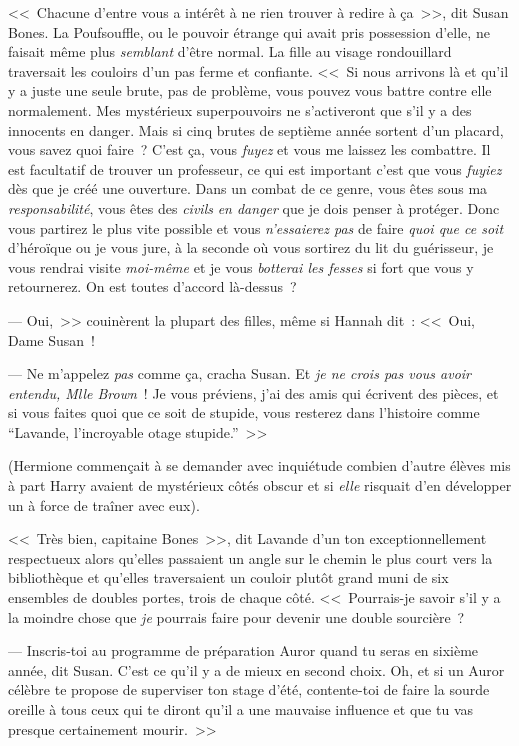 <<~Chacune d'entre vous a intérêt à ne rien trouver à redire à ça~>>, dit Susan Bones. La Poufsouffle, ou le pouvoir étrange qui avait pris possession d'elle, ne faisait même plus \emph{semblant} d'être normal. La fille au visage rondouillard traversait les couloirs d'un pas ferme et confiante. <<~Si nous arrivons là et qu'il y a juste une seule brute, pas de problème, vous pouvez vous battre contre elle normalement. Mes mystérieux superpouvoirs ne s'activeront que s'il y a des innocents en danger. Mais si cinq brutes de septième année sortent d'un placard, vous savez quoi faire~? C'est ça, vous \emph{fuyez} et vous me laissez les combattre. Il est facultatif de trouver un professeur, ce qui est important c'est que vous \emph{fuyiez} dès que je créé une ouverture. Dans un combat de ce genre, vous êtes sous ma \emph{responsabilité}, vous êtes des \emph{civils} \emph{en danger} que je dois penser à protéger. Donc vous partirez le plus vite possible et vous \emph{n'essaierez pas} de faire \emph{quoi que ce soit} d'héroïque ou je vous jure, à la seconde où vous sortirez du lit du guérisseur, je vous rendrai visite \emph{moi-même} et je vous \emph{botterai les fesses} si fort que vous y retournerez. On est toutes d'accord là-dessus~?

--- Oui,~>> couinèrent la plupart des filles, même si Hannah dit~: <<~Oui, Dame Susan~!

--- Ne m'appelez \emph{pas} comme ça, cracha Susan. Et \emph{je ne crois pas vous avoir entendu, Mlle Brown}~! Je vous préviens, j'ai des amis qui écrivent des pièces, et si vous faites quoi que ce soit de stupide, vous resterez dans l'histoire comme “Lavande, l'incroyable otage stupide.”~>>

(Hermione commençait à se demander avec inquiétude combien d'autre élèves mis à part Harry avaient de mystérieux côtés obscur et si \emph{elle} risquait d'en développer un à force de traîner avec eux).

<<~Très bien, capitaine Bones~>>, dit Lavande d'un ton exceptionnellement respectueux alors qu'elles passaient un angle sur le chemin le plus court vers la bibliothèque et qu'elles traversaient un couloir plutôt grand muni de six ensembles de doubles portes, trois de chaque côté. <<~Pourrais-je savoir s'il y a la moindre chose que \emph{je} pourrais faire pour devenir une double sourcière~?

--- Inscris-toi au programme de préparation Auror quand tu seras en sixième année, dit Susan. C'est ce qu'il y a de mieux en second choix. Oh, et si un Auror célèbre te propose de superviser ton stage d'été, contente-toi de faire la sourde oreille à tous ceux qui te diront qu'il a une mauvaise influence et que tu vas presque certainement mourir.~>>

